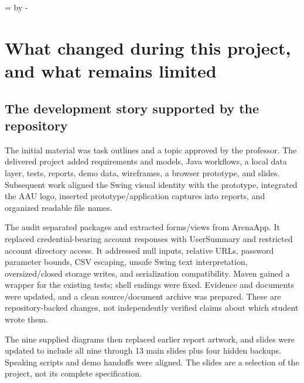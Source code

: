 \documentclass[12pt]{article}
\newcommand{\topic}[1]{\needroom{9\baselineskip}\section{#1}}
\newcommand{\needroom}[1]{\par\begingroup\dimen0=\pagegoal\advance\dimen0 by -\pagetotal\ifdim\dimen0<#1\newpage\fi\endgroup}
\begin{document}
\topic{What changed during this project, and what remains limited}
\subsection{The development story supported by the repository}
The initial material was task outlines and a topic approved by the professor. The delivered project added requirements and models, Java workflows, a local data layer, tests, reports, demo data, wireframes, a browser prototype, and slides. Subsequent work aligned the Swing visual identity with the prototype, integrated the AAU logo, inserted prototype/application captures into reports, and organized readable file names.

The audit separated packages and extracted forms/views from ArenaApp. It replaced credential-bearing account responses with UserSummary and restricted account directory access. It addressed null inputs, relative URLs, password parameter bounds, CSV escaping, unsafe Swing text interpretation, oversized/closed storage writes, and serialization compatibility. Maven gained a wrapper for the existing tests; shell endings were fixed. Evidence and documents were updated, and a clean source/document archive was prepared. These are repository-backed changes, not independently verified claims about which student wrote them.

The nine supplied diagrams then replaced earlier report artwork, and slides were updated to include all nine through 13 main slides plus four hidden backups. Speaking scripts and demo handoffs were aligned. The slides are a selection of the project, not its complete specification.
\end{document}
